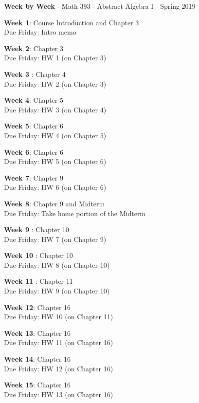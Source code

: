 \documentclass[10pt]{amsart}
\begin{document}
\pagestyle{empty}

\begin{center}
{\bf Week by Week} - Math 393 - Abstract Algebra I - Spring 2019
\end{center}

{\bf Week 1}: Course Introduction and Chapter 3 \\
Due Friday: Intro memo

{\bf Week 2}: Chapter 3 \\
Due Friday: HW 1 (on Chapter 3)
	
{\bf Week 3 }: Chapter 4\\
Due Friday: HW 2 (on Chapter 3)

{\bf Week 4}: Chapter 5\\
Due Friday: HW 3 (on Chapter 4)

{\bf Week 5}: Chapter 6\\
Due Friday: HW 4 (on Chapter 5)

{\bf Week 6}: Chapter 6\\
Due Friday: HW 5 (on Chapter 6)

{\bf Week 7}:  Chapter 9\\
Due Friday: HW 6 (on Chapter 6)

{\bf Week 8}: Chapter 9 and Midterm\\
Due Friday: Take home portion of the Midterm

{\bf Week 9 }: Chapter 10 \\
Due Friday: HW 7 (on Chapter 9)

{\bf Week 10 }: Chapter 10\\
Due Friday: HW 8 (on Chapter 10)

{\bf Week 11 }: Chapter 11\\
Due Friday: HW 9 (on Chapter 10)

{\bf Week 12}:  Chapter 16\\
Due Friday: HW 10 (on Chapter 11)

{\bf Week 13}:  Chapter 16\\
Due Friday: HW 11 (on Chapter 16)

{\bf Week 14}:  Chapter 16\\
Due Friday: HW 12 (on Chapter 16)

{\bf Week 15}:  Chapter 16\\
Due Friday: HW 13 (on Chapter 16)
\end{document}
